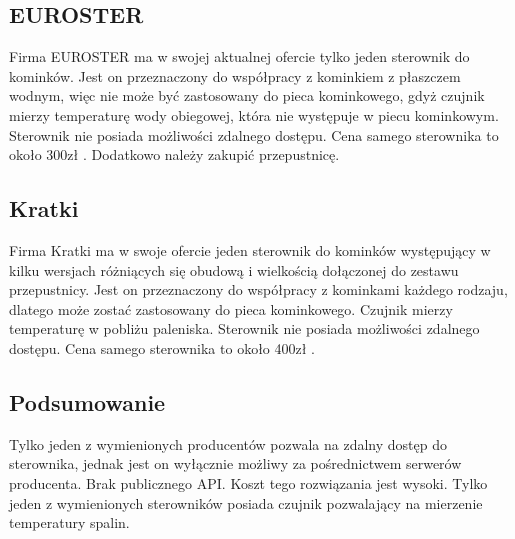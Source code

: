 \documentclass[11pt]{report}
\begin{document}
 \subsection{EUROSTER}
 Firma EUROSTER ma w swojej aktualnej ofercie \cite{Euroster} tylko jeden sterownik do kominków. Jest on \cite{EurosterSterownik} przeznaczony do współpracy z kominkiem z płaszczem wodnym, więc nie może być zastosowany do pieca kominkowego, gdyż czujnik mierzy temperaturę wody obiegowej, która nie występuje w piecu kominkowym. Sterownik nie posiada możliwości zdalnego dostępu.
 Cena samego sterownika to około 300zł \cite{EurosterSterownikCena}. Dodatkowo należy zakupić przepustnicę.
 \subsection{Kratki}
 Firma Kratki ma w swoje ofercie \cite{Kratki} jeden sterownik do kominków występujący w kilku wersjach różniących się obudową i wielkością dołączonej do zestawu przepustnicy.
 Jest on przeznaczony do współpracy z kominkami każdego rodzaju, dlatego może zostać zastosowany do pieca kominkowego. Czujnik mierzy temperaturę w pobliżu paleniska. Sterownik nie posiada możliwości zdalnego dostępu. 
 Cena samego sterownika to około 400zł \cite{KratkiSterownik}.
  \subsection{Podsumowanie}
  Tylko jeden z wymienionych producentów pozwala na zdalny dostęp do sterownika, jednak jest on wyłącznie możliwy za pośrednictwem serwerów producenta. Brak publicznego API. Koszt tego rozwiązania jest wysoki.
  Tylko jeden z wymienionych sterowników posiada czujnik pozwalający na mierzenie temperatury spalin.
  
  
\end{document}
